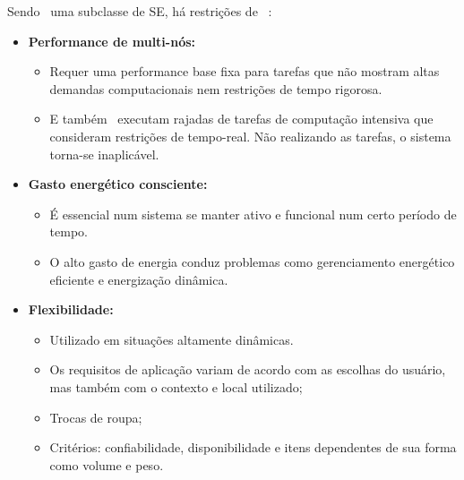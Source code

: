    \begin{frame}%
      
      Sendo \wearables\ uma subclasse de SE, há restrições de \design\  \cite{Plessl2003}:
      
      \begin{itemize}
         \setlength{\itemsep}{0.7em}
         \item \textbf{Performance de multi-nós:} 
         \begin{itemize}
            \setlength{\itemsep}{0.3em}
            \item Requer uma performance base fixa para tarefas que não mostram altas demandas computacionais nem restrições de tempo rigorosa.
            
            \item E também \wearables\ executam rajadas de tarefas de computação intensiva que consideram restrições de tempo-real. 
            Não realizando as tarefas, o sistema torna-se inaplicável.
         \end{itemize}
         
         \item \textbf{Gasto energético consciente:} 
         \begin{itemize}
            \item É essencial num sistema se manter ativo e funcional num certo período de tempo. 
            \item O alto gasto de energia conduz problemas como gerenciamento energético eficiente e energização dinâmica.
            
         \end{itemize}
         
         \item \textbf{Flexibilidade:}
         \begin{itemize}
            \setlength{\itemsep}{0.3em}
            \item Utilizado em situações altamente dinâmicas.
            
            \item Os requisitos de aplicação variam de acordo com as escolhas do usuário, mas também com o contexto e local utilizado;
            \item Trocas de roupa;
            \item Critérios: confiabilidade, disponibilidade e itens dependentes de sua forma como volume e peso.
         \end{itemize}
      \end{itemize}
   \end{frame}

